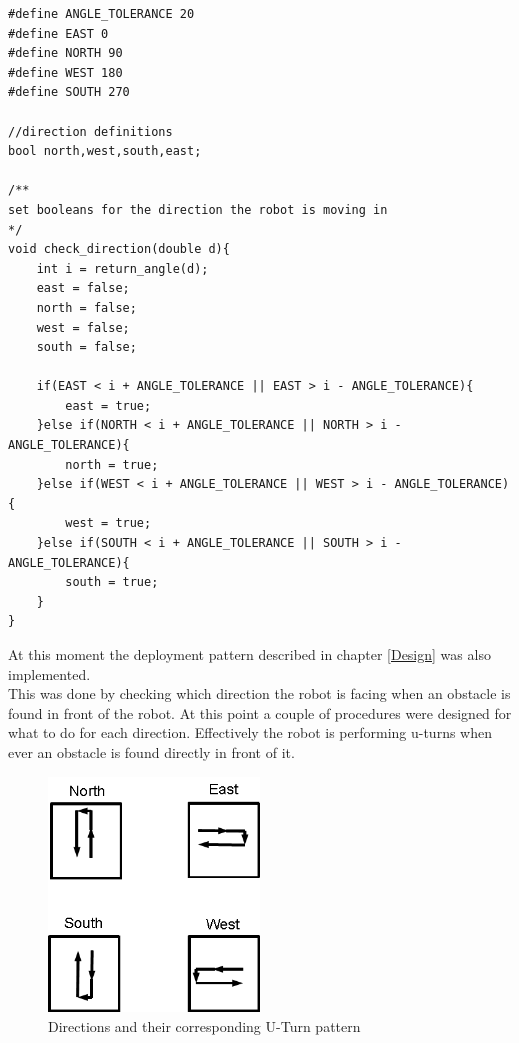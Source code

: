 \begin{lstlisting}[caption={Early check of the movement direction}]
#define ANGLE_TOLERANCE 20
#define EAST 0
#define NORTH 90
#define WEST 180
#define SOUTH 270

//direction definitions
bool north,west,south,east;

/**
set booleans for the direction the robot is moving in
*/
void check_direction(double d){
	int i = return_angle(d);
	east = false;
	north = false;
	west = false;
	south = false;

	if(EAST < i + ANGLE_TOLERANCE || EAST > i - ANGLE_TOLERANCE){
		east = true;
	}else if(NORTH < i + ANGLE_TOLERANCE || NORTH > i - ANGLE_TOLERANCE){
		north = true;
	}else if(WEST < i + ANGLE_TOLERANCE || WEST > i - ANGLE_TOLERANCE){
		west = true;
	}else if(SOUTH < i + ANGLE_TOLERANCE || SOUTH > i - ANGLE_TOLERANCE){
		south = true;
	}
}
\end{lstlisting}

At this moment the deployment pattern described in chapter \ref{Design}  was also implemented. \\
This was done by checking which direction the robot is facing when an obstacle is found in front of the robot. At this point a couple of procedures were designed for what to do for each direction. Effectively the robot is performing u-turns when ever an obstacle is found directly in front of it. 

\begin{figure}[h]
\centering
\includegraphics[width = 0.5\textwidth]{../../figures/direction_uturn_pattern} 
\caption{Directions and their corresponding U-Turn pattern}
\label{directions_uturn_pattern}
\end{figure}

